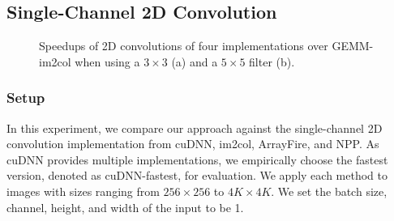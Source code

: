 \subsection{Single-Channel 2D Convolution\label{sec:ex2dc}}
\begin{figure}
\centering
{}
\hspace{0em}
	
\caption{Speedups of 2D convolutions of four implementations over GEMM-im2col when using a $3 \times 3$ (a) and a $5 \times 5$ filter (b).}
\label{fig:2druntime}
\vspace{-3mm}
\end{figure}


\subsubsection{Setup}
In this experiment, we compare our approach against the single-channel 2D convolution implementation from cuDNN, im2col, ArrayFire, and
NPP. As cuDNN provides multiple implementations, we empirically choose the fastest version, denoted as cuDNN-fastest, for evaluation. We
apply each method to images with sizes ranging from $256 \times 256$ to $4K \times 4K$. We set the batch size, channel, height, and width
of the input to be 1.


